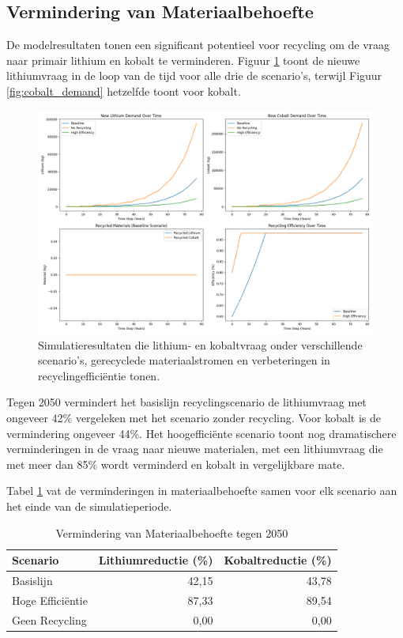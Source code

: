 \documentclass[10pt,a4paper,twocolumn]{article}
\begin{document}
\subsection{Vermindering van Materiaalbehoefte}

De modelresultaten tonen een significant potentieel voor recycling om de vraag naar primair lithium en kobalt te verminderen. Figuur \ref{fig:lithium_demand} toont de nieuwe lithiumvraag in de loop van de tijd voor alle drie de scenario's, terwijl Figuur \ref{fig:cobalt_demand} hetzelfde toont voor kobalt.

\begin{figure}[H]
    \centering
    \includegraphics[width=0.8\columnwidth]{recycling_analysis_results.png}
    \caption{Simulatieresultaten die lithium- en kobaltvraag onder verschillende scenario's, gerecyclede materiaalstromen en verbeteringen in recyclingefficiëntie tonen.}
    \label{fig:lithium_demand}
\end{figure}

Tegen 2050 vermindert het basislijn recyclingscenario de lithiumvraag met ongeveer 42\% vergeleken met het scenario zonder recycling. Voor kobalt is de vermindering ongeveer 44\%. Het hoogefficiënte scenario toont nog dramatischere verminderingen in de vraag naar nieuwe materialen, met een lithiumvraag die met meer dan 85\% wordt verminderd en kobalt in vergelijkbare mate.

Tabel \ref{tab:results} vat de verminderingen in materiaalbehoefte samen voor elk scenario aan het einde van de simulatieperiode.

\begin{table}[h]
\centering
\caption{Vermindering van Materiaalbehoefte tegen 2050}
\begin{tabular}{lrr}
\toprule
Scenario & Lithiumreductie (\%) & Kobaltreductie (\%) \\
\midrule
Basislijn & 42,15 & 43,78 \\
Hoge Efficiëntie & 87,33 & 89,54 \\
Geen Recycling & 0,00 & 0,00 \\
\bottomrule
\end{tabular}
\label{tab:results}
\end{table}
\end{document}
